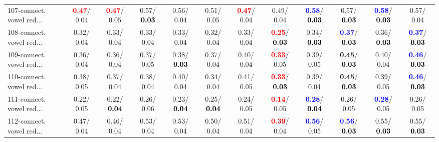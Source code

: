 \begin{table}[h]
\begin{center}
{\begin{tabular}{lc|c|c|c|c|c|c|c|c|c|c}
107-connect. vowel red... & \textcolor{red}{\textbf{  0.47}}/  0.04 & \textcolor{red}{\textbf{  0.47}}/  0.05 &   0.57/\textcolor{black}{\textbf{  0.03}} &   0.56/  0.04 &   0.51/  0.05 & \textcolor{red}{\textbf{  0.47}}/  0.04 &   0.49/  0.04 & \textcolor{blue}{\textbf{  0.58}}/\textcolor{black}{\textbf{  0.03}} &   0.57/\textcolor{black}{\textbf{  0.03}} & \textcolor{blue}{\textbf{  0.58}}/\textcolor{black}{\textbf{  0.03}} &   0.57/  0.04 \\
108-connect. vowel red... &   0.32/  0.04 &   0.33/  0.04 &   0.33/  0.04 &   0.33/  0.04 &   0.32/  0.04 &   0.33/  0.04 & \textcolor{red}{\textbf{  0.25}}/\textcolor{black}{\textbf{  0.03}} &   0.34/\textcolor{black}{\textbf{  0.03}} & \textcolor{blue}{\textbf{  0.37}}/\textcolor{black}{\textbf{  0.03}} &   0.36/\textcolor{black}{\textbf{  0.03}} & \textcolor{blue}{\textbf{  0.37}}/\textcolor{black}{\textbf{  0.03}} \\
109-connect. vowel red... &   0.36/  0.04 &   0.36/  0.04 &   0.37/  0.05 &   0.38/\textcolor{black}{\textbf{  0.03}} &   0.37/  0.04 &   0.40/  0.04 & \textcolor{red}{\textbf{  0.33}}/  0.05 &   0.39/  0.05 & \textcolor{black}{\textbf{  0.45}}/\textcolor{black}{\textbf{  0.03}} &   0.40/  0.04 & \underline{\textcolor{blue}{\textbf{  0.46}}}/\textcolor{black}{\textbf{  0.03}} \\
110-connect. vowel red... &   0.38/  0.05 &   0.37/  0.04 &   0.38/  0.04 &   0.40/  0.04 &   0.34/  0.04 &   0.41/  0.05 & \textcolor{red}{\textbf{  0.33}}/\textcolor{black}{\textbf{  0.03}} &   0.39/  0.04 & \textcolor{black}{\textbf{  0.45}}/\textcolor{black}{\textbf{  0.03}} &   0.39/  0.05 & \underline{\textcolor{blue}{\textbf{  0.46}}}/\textcolor{black}{\textbf{  0.03}} \\ \hline
111-connect. vowel red... &   0.22/  0.05 &   0.22/\textcolor{black}{\textbf{  0.04}} &   0.26/  0.06 &   0.23/\textcolor{black}{\textbf{  0.04}} &   0.25/\textcolor{black}{\textbf{  0.04}} &   0.24/  0.05 & \textcolor{red}{\textbf{  0.14}}/  0.05 & \textcolor{blue}{\textbf{  0.28}}/\textcolor{black}{\textbf{  0.04}} &   0.26/  0.05 & \textcolor{blue}{\textbf{  0.28}}/  0.05 &   0.26/  0.05 \\
112-connect. vowel red... &   0.47/  0.04 &   0.46/  0.04 &   0.53/  0.04 &   0.53/  0.04 &   0.50/  0.04 &   0.51/  0.04 & \textcolor{red}{\textbf{  0.39}}/  0.04 & \textcolor{blue}{\textbf{  0.56}}/  0.05 & \textcolor{blue}{\textbf{  0.56}}/\textcolor{black}{\textbf{  0.03}} &   0.55/\textcolor{black}{\textbf{  0.03}} &   0.55/\textcolor{black}{\textbf{  0.03}} \\

\end{tabular}}
\end{center}
\end{table}
